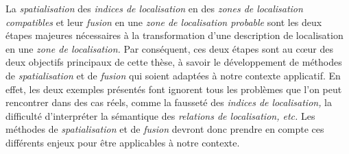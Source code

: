 La \emph{spatialisation} des \emph{indices de localisation} en des
\emph{zones de localisation compatibles} et leur \emph{fusion} en une
\emph{zone de localisation probable} sont les deux étapes majeures
nécessaires à la transformation d'une description de localisation en
une \emph{zone de localisation.} Par conséquent, ces deux étapes sont
au cœur des deux objectifs principaux de cette thèse, à savoir le
développement de méthodes de \emph{spatialisation} et de \emph{fusion}
qui soient adaptées à notre contexte applicatif. En effet, les deux
exemples présentés font ignorent tous les problèmes que l'on peut
rencontrer dans des cas réels, comme la fausseté des \emph{indices de
  localisation,} la difficulté d'interpréter la sémantique des
\emph{relations de localisation, etc.} Les méthodes de
\emph{spatialisation} et de \emph{fusion} devront donc prendre en
compte ces différents enjeux pour être applicables à notre contexte.



